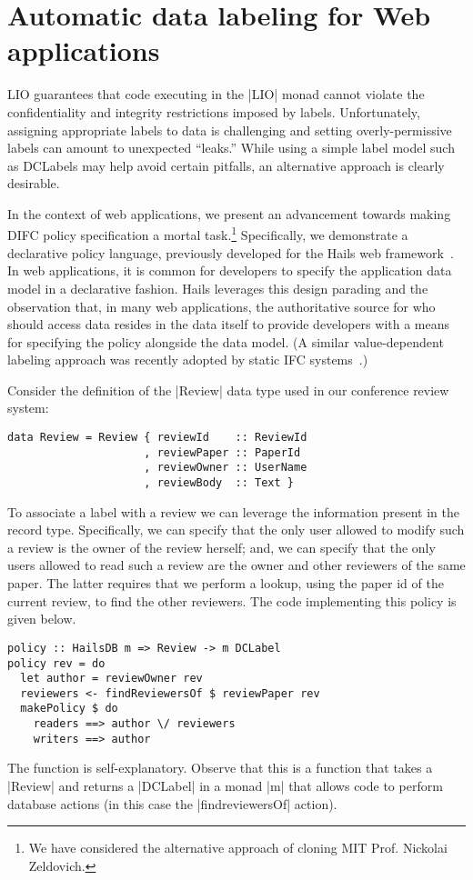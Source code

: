 \section{Automatic data labeling for Web applications}

LIO guarantees that code executing in the \hs|LIO| monad cannot
violate the confidentiality and integrity restrictions imposed by
labels.
%
Unfortunately, assigning appropriate labels to data is challenging and
setting overly-permissive labels can amount to unexpected ``leaks.''
%
While using a simple label model such as DCLabels may help avoid
certain pitfalls, an alternative approach is clearly desirable.

In the context of web applications, we present an advancement towards
making DIFC policy specification a mortal task.\footnote{
  We have considered the alternative approach of cloning MIT Prof.
  Nickolai Zeldovich.
}
%
Specifically, we demonstrate a declarative policy language, previously
developed for the Hails web framework~\cite{hails}.
%
In web applications, it is common for developers to specify the
application data model in a declarative fashion.
%
Hails leverages this design parading and the observation that, in many
web applications, the authoritative source for who should access data
resides in the data itself to provide developers with a means for
specifying the policy alongside the data model.
%
(A similar value-dependent labeling approach was recently adopted by
static IFC systems~\cite{dbifc}.)

Consider the definition of the \hs|Review| data type used in our
conference review system:
\begin{verbatim}
data Review = Review { reviewId    :: ReviewId
                     , reviewPaper :: PaperId
                     , reviewOwner :: UserName
                     , reviewBody  :: Text }
\end{verbatim}
To associate a label with a review we can leverage the 
information present in the record type.
%
Specifically, we can specify that the only user allowed to modify such
a review is the owner of the review herself; and, we can specify that
the only users allowed to read such a review are the owner and other
reviewers of the same paper.
%
The latter requires that we perform a lookup, using the paper id of
the current review, to find the other reviewers.
%
The code implementing this policy is given below.
%
\begin{verbatim}
policy :: HailsDB m => Review -> m DCLabel
policy rev = do
  let author = reviewOwner rev
  reviewers <- findReviewersOf $ reviewPaper rev
  makePolicy $ do
    readers ==> author \/ reviewers
    writers ==> author
\end{verbatim}
%
The function is self-explanatory.
%
Observe that this is a function that takes a \hs|Review| and returns a
\hs|DCLabel| in a monad \hs|m| that allows code to perform database
actions (in this case the \hs|findreviewersOf| action).
%

